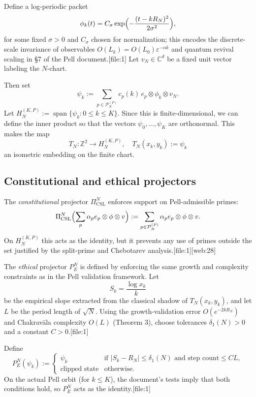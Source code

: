\documentclass[11pt]{article}
\begin{document}
Define a log-periodic packet
\[
\phi_k(t) = C_\sigma \exp\Bigl(-\frac{(t - k R_N)^2}{2\sigma^2}\Bigr),
\]
for some fixed \(\sigma>0\) and \(C_\sigma\) chosen for normalization;
this encodes the discrete-scale invariance of observables
\(O(L_k) = O(L_0)\varepsilon^{-\alpha k}\) and quantum revival scaling
in §7 of the Pell document.[file:1] Let \(v_N\in\mathbb{C}^d\) be a fixed
unit vector labeling the \(N\)-chart.

Then set
\[
\psi_k := \sum_{p \in \mathcal{P}_N^{(P)}} c_p(k)\, e_p \otimes \phi_k \otimes v_N.
\]
Let \(H_N^{(K,P)} := \operatorname{span}\{\psi_k : 0\le k \le K\}\). Since
this is finite-dimensional, we can define the inner product so that the
vectors \(\psi_0,\dots,\psi_K\) are orthonormal. This makes the map
\[
T_N : \mathbb{Z}^2 \to H_N^{(K,P)}, \quad T_N(x_k,y_k) := \psi_k
\]
an isometric embedding on the finite chart.

\subsection{Constitutional and ethical projectors}

The \emph{constitutional} projector \(\Pi_{\text{CSL}}^N\) enforces
support on Pell-admissible primes:
\[
\Pi_{\text{CSL}}^N \Bigl(\sum_{p} \alpha_p e_p \otimes \phi \otimes v\Bigr)
:= \sum_{p \in \mathcal{P}_N^{(P)}} \alpha_p e_p \otimes \phi \otimes v.
\]
On \(H_N^{(K,P)}\) this acts as the identity, but it prevents any use of
primes outside the set justified by the split-prime and Chebotarev
analysis.[file:1][web:28]

The \emph{ethical} projector \(P_E^N\) is defined by enforcing the same
growth and complexity constraints as in the Pell validation framework.
Let
\[
S_k = \frac{\log x_k}{k}
\]
be the empirical slope extracted from the classical shadow of
\(T_N(x_k, y_k)\), and let \(L\) be the period length of \(\sqrt{N}\).
Using the growth-validation error \(O(e^{-2kR_N})\) and Chakrav\=ala
complexity \(O(L)\) (Theorem 3), choose tolerances
\(\delta_1(N) > 0\) and a constant \(C > 0\).[file:1]

Define
\[
P_E^N(\psi_k) :=
\begin{cases}
\psi_k & \text{if } |S_k - R_N| \le \delta_1(N)
          \text{ and step count} \le C L,\\[4pt]
\text{clipped state} & \text{otherwise}.
\end{cases}
\]
On the actual Pell orbit (for \(k \le K\)), the document's tests imply
that both conditions hold, so \(P_E^N\) acts as the identity.[file:1]
\end{document}
